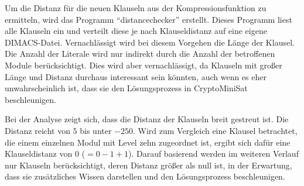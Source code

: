 Um die Distanz für die neuen Klauseln aus der Kompressionsfunktion zu ermitteln, wird das Programm "`distancechecker"' erstellt. Dieses Programm liest alle Klauseln
ein und verteilt diese je nach Klauseldistanz auf eine eigene DIMACS-Datei. Vernachlässigt wird bei diesem Vorgehen die Länge der Klausel. Die Anzahl der Literale
wird nur indirekt durch die Anzahl der betroffenen Module berücksichtigt. Dies wird aber vernachlässigt, da Klauseln mit großer Länge und Distanz durchaus interessant
sein könnten, auch wenn es eher unwahrscheinlich ist, dass sie den Lösungsprozess in CryptoMiniSat beschleunigen.

Bei der Analyse zeigt sich, dass die Distanz der Klauseln breit gestreut ist. Die Distanz reicht von $5$ bis unter $-250$. Wird zum Vergleich eine Klausel betrachtet,
die einem einzelnen Modul mit Level zehn zugeordnet ist, ergibt sich dafür eine Klauseldistanz von $0$ ($= 0 - 1 + 1$). Darauf basierend werden im weiteren Verlauf
nur Klauseln berücksichtigt, deren Distanz größer als null ist, in der Erwartung, dass sie zusätzliches Wissen darstellen und den Lösungsprozess beschleunigen.